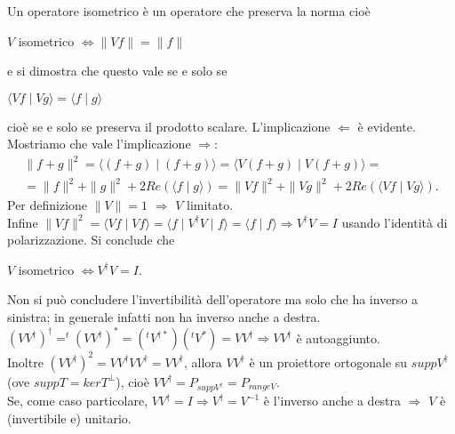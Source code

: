 Un operatore isometrico è un operatore che preserva la norma cioè
\begin{center} $V$ isometrico $\Leftrightarrow \parallel Vf \parallel = \parallel f \parallel $ \end{center}
e si dimostra che questo vale se e solo se
\begin{center} $\langle Vf \mid Vg \rangle = \langle f \mid g \rangle$ \end{center}
cioè se e solo se preserva il prodotto scalare. L'implicazione $\Leftarrow$ è evidente. Mostriamo che vale l'implicazione $\Rightarrow$:
\begin{equation*}\begin{split} \parallel f+g \parallel^{2} = \langle (f+g) \mid (f+g)  \rangle = \langle V(f+g) \mid V(f+g) \rangle =\\
=\parallel f \parallel^{2} + \parallel g \parallel^{2} +2Re(\langle f \mid g \rangle) = \parallel Vf \parallel^{2} + \parallel Vg \parallel^{2} +2Re(\langle Vf \mid Vg \rangle).
\end{split}\end{equation*}
Per definizione $\parallel V \parallel =1$ $\Rightarrow$ $V$ limitato. \\
Infine $\parallel Vf \parallel^{2} =  \langle Vf \mid Vf \rangle = \langle f \mid V^{\dag}V \mid f \rangle = \langle f \mid f \rangle \Rightarrow V^{\dag}V = I$ usando l'identità di polarizzazione. Si conclude che
\begin{center} $V$ isometrico $\Leftrightarrow V^{\dag}V=I$. \end{center}
Non si può concludere l'invertibilità dell'operatore ma solo che ha inverso a sinistra; in generale infatti non ha inverso anche a destra. \\
$(VV^{\dag})^{\dag} = ^{t} (VV^{\dag})^{*} =(^{t}V^{\dag *}) (^{t}V^{*}) = VV^{\dag} \Rightarrow VV^{\dag}$ è autoaggiunto. \\
Inoltre $(VV^{\dag})^{2} = VV^{\dag}VV^{\dag} = VV^{\dag}$, allora $VV^{\dag}$ è un proiettore ortogonale su $suppV^{\dag}$ (ove $suppT=kerT^{\perp}$), cioè $VV^{\dag}=P_{suppV^{\dag}}=P_{rangeV}$. \\
Se, come caso particolare, $VV^{\dag}=I \Rightarrow V^{\dag}=V^{-1}$ è l'inverso anche a destra $\Rightarrow$ $V$ è (invertibile e) unitario.

